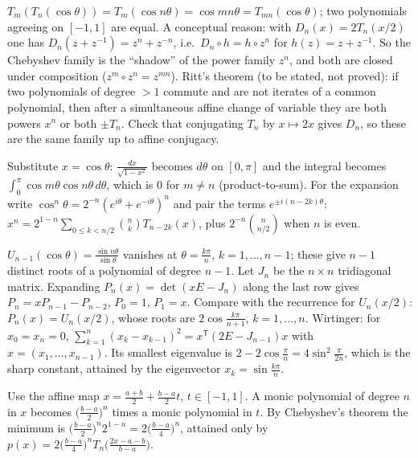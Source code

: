 \documentclass[11pt,a4paper]{article}
\begin{document}

 $T_m(T_n(\cos\theta))=T_m(\cos n\theta)=\cos mn\theta=T_{mn}(\cos\theta)$; two polynomials agreeing on $[-1,1]$ are equal.
 A conceptual reason: with $D_n(x)=2T_n(x/2)$ one has $D_n(z+z^{-1})=z^n+z^{-n}$, i.e.\ $D_n\circ h=h\circ z^n$ for $h(z)=z+z^{-1}$. So the Chebyshev family is the ``shadow'' of the power family $z^n$, and both are closed under composition ($z^m\circ z^n=z^{mn}$).
 Ritt's theorem (to be stated, not proved): if two polynomials of degree $>1$ commute and are not iterates of a common polynomial, then after a simultaneous affine change of variable they are both powers $x^n$ or both $\pm T_n$. Check that conjugating $T_n$ by $x\mapsto2x$ gives $D_n$, so these are the same family up to affine conjugacy.

 Substitute $x=\cos\theta$: $\frac{dx}{\sqrt{1-x^2}}$ becomes $d\theta$ on $[0,\pi]$ and the integral becomes $\int_0^\pi\cos m\theta\cos n\theta\,d\theta$, which is $0$ for $m\ne n$ (product-to-sum).
 For the expansion write $\cos^n\theta=2^{-n}(e^{i\theta}+e^{-i\theta})^n$ and pair the terms $e^{\pm i(n-2k)\theta}$: $x^n=2^{1-n}\sum_{0\le k<n/2}\binom nkT_{n-2k}(x)$, plus $2^{-n}\binom n{n/2}$ when $n$ is even.

 $U_{n-1}(\cos\theta)=\frac{\sin n\theta}{\sin\theta}$ vanishes at $\theta=\frac{k\pi}n$, $k=1,\dots,n-1$; these give $n-1$ distinct roots of a polynomial of degree $n-1$.
 Let $J_n$ be the $n\times n$ tridiagonal matrix. Expanding $P_n(x)=\det(xE-J_n)$ along the last row gives $P_n=xP_{n-1}-P_{n-2}$, $P_0=1$, $P_1=x$. Compare with the recurrence for $U_n(x/2)$: $P_n(x)=U_n(x/2)$, whose roots are $2\cos\frac{k\pi}{n+1}$, $k=1,\dots,n$.
 Wirtinger: for $x_0=x_n=0$, $\sum_{k=1}^n(x_k-x_{k-1})^2=x^{\mathsf T}(2E-J_{n-1})x$ with $x=(x_1,\dots,x_{n-1})$. Its smallest eigenvalue is $2-2\cos\frac\pi n=4\sin^2\frac\pi{2n}$, which is the sharp constant, attained by the eigenvector $x_k=\sin\frac{k\pi}n$.

 Use the affine map $x=\frac{a+b}2+\frac{b-a}2t$, $t\in[-1,1]$. A monic polynomial of degree $n$ in $x$ becomes $\bigl(\frac{b-a}2\bigr)^n$ times a monic polynomial in $t$.
 By Chebyshev's theorem the minimum is $\bigl(\frac{b-a}2\bigr)^n2^{1-n}=2\bigl(\frac{b-a}4\bigr)^n$, attained only by $p(x)=2\bigl(\frac{b-a}4\bigr)^nT_n\bigl(\frac{2x-a-b}{b-a}\bigr)$.
\end{document}
